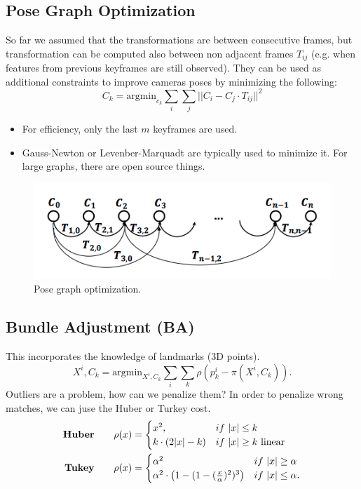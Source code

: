 \documentclass[a4paper,12 pt]{article}
\theoremstyle{definition}
\theoremstyle{remark}
\theoremstyle{definition}
\theoremstyle{definition}
\theoremstyle{definition}
\theoremstyle{remark}
\theoremstyle{definition}
\begin{document}
\subsection*{Pose Graph Optimization}
So far we assumed that the transformations are between consecutive frames, but transformation can be computed also between non adjacent frames $T_{ij}$ (e.g. when features from previous keyframes are still observed). They can be used as additional constraints to improve cameras poses by minimizing the following:
\begin{equation}
C_k=\text{argmin}_{c_k} \sum_{i} \sum_{j} ||C_i-C_j\cdot T_{ij}||^2
\end{equation}
\begin{itemize}
\item For efficiency, only the last $m$ keyframes are used.
\item Gauss-Newton or Levenber-Marquadt are typically used to minimize it. For large graphs, there are open source things.
\end{itemize}
\begin{figure}[h!]
\begin{center}
\includegraphics[scale=0.5]{pics/pose}
\caption{Pose graph optimization.}
\end{center}
\end{figure}
\subsection*{Bundle Adjustment (BA)}
This incorporates the knowledge of landmarks (3D points).  
\begin{equation}
X^i,C_k=\text{argmin}_{X^i,C_k} \sum_{i} \sum_{k}\rho \left( p_k^i-\pi(X^i,C_k)\right).
\end{equation}
Outliers are a problem, how can we penalize them? In order to penalize wrong matches, we can juse the Huber or Turkey cost.
\begin{equation}
\begin{split}
\text{\textbf{Huber}} \qquad \rho(x)&=\begin{cases}
x^2, &if \ |x|\leq k\\
k\cdot (2|x|-k)& if \ |x| \geq k \text{ linear}
\end{cases}\\
\text{\textbf{Tukey}} \qquad \rho(x)&=\begin{cases}
\alpha^2&if \ |x|\geq \alpha \\
\alpha^2 \cdot \left(1-(1-(\frac{x}{\alpha})^2)^3 \right)&if \ |x|\leq \alpha.
\end{cases}
\end{split}
\end{equation}
\end{document}
